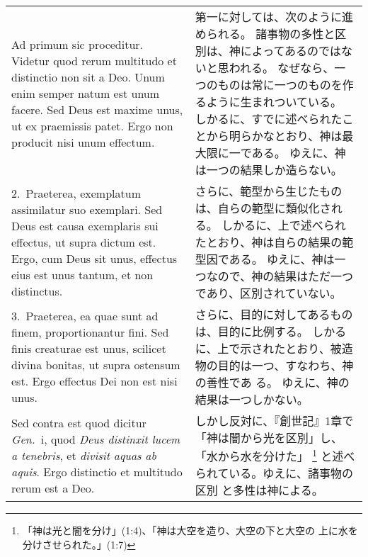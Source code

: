 \documentclass[10pt]{jsarticle} %
\begin{document}
\begin{longtable}{p{21em}p{21em}}


{\huge A}{\sc d primum sic proceditur}. Videtur quod
 rerum multitudo et distinctio non sit a Deo. Unum enim semper natum est
 unum facere. Sed Deus est maxime unus, ut ex praemissis patet. Ergo non
 producit nisi unum effectum.

&
第一に対しては、次のように進められる。
諸事物の多性と区別は、神によってあるのではないと思われる。
なぜなら、一つのものは常に一つのものを作るように生まれついている。
しかるに、すでに述べられたことから明らかなとおり、神は最大限に一である。
ゆえに、神は一つの結果しか造らない。

\\





2.~{\sc Praeterea}, exemplatum assimilatur suo
 exemplari. Sed Deus est causa exemplaris sui effectus, ut supra dictum
 est. Ergo, cum Deus sit unus, effectus eius est unus tantum, et non
 distinctus.


&
さらに、範型から生じたものは、自らの範型に類似化される。
しかるに、上で述べられたとおり、神は自らの結果の範型因である。
ゆえに、神は一つなので、神の結果はただ一つであり、区別されていない。

\\





3.~{\sc Praeterea}, ea quae sunt ad finem,
 proportionantur fini. Sed finis creaturae est unus, scilicet divina
 bonitas, ut supra ostensum est. Ergo effectus Dei non est nisi unus.


&
さらに、目的に対してあるものは、目的に比例する。
しかるに、上で示されたとおり、被造物の目的は一つ、すなわち、神の善性であ
 る。
ゆえに、神の結果は一つしかない。

\\





{\sc Sed contra est} quod dicitur {\it Gen.}~{\sc i}, quod {\it Deus
 distinxit lucem a tenebris}, et {\it divisit aquas ab aquis}. Ergo
 distinctio et multitudo rerum est a Deo.


&

しかし反対に、『創世記』1章で「神は闇から光を区別」し、「水から水を分けた」
 \footnote{「神は光と闇を分け」(1:4)、「神は大空を造り、大空の下と大空の
 上に水を分けさせられた。」(1:7)} と述べられている。ゆえに、諸事物の区別
 と多性は神による。




\end{longtable}
\end{document}
